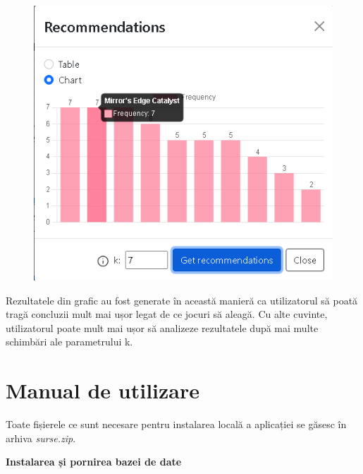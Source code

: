 \documentclass[12pt,a4paper]{report}
\begin{document}
\begin{figure}[H]
\centering
\caption{}
\begin{adjustbox}{max size={\textwidth}{\textheight}}
\includegraphics[scale=1]{exemplu_40_modal_4}
\end{adjustbox}
\caption*{}
\end{figure}

Rezultatele din grafic au fost generate în această manieră ca utilizatorul să poată tragă concluzii mult mai ușor legat de ce jocuri să aleagă. Cu alte cuvinte, utilizatorul poate mult mai ușor să analizeze rezultatele după mai multe schimbări ale parametrului k.


\section{Manual de utilizare}

Toate fișierele ce sunt necesare pentru instalarea locală a aplicației se găsesc în arhiva \emph{surse.zip}.

\newpage

\bigskip
\textbf{Instalarea și pornirea bazei de date}
\bigskip
\end{document}
